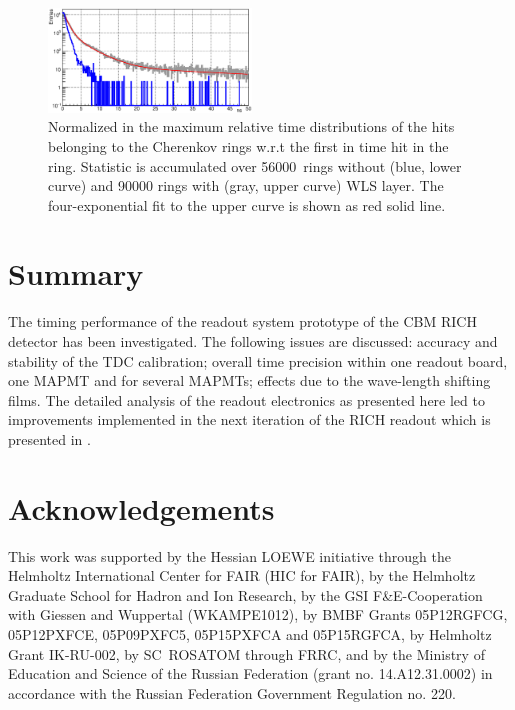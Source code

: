 \documentclass[final,5p,times,twocolumn]{elsarticle}
\begin{document}
\begin{figure}[tbh]
	\centering
	\includegraphics[width=0.48\textwidth]{figures/WLS_on_fitting_with_WLS_off_scaled.eps}
	\caption{Normalized in the maximum relative time distributions of the hits belonging to the Cherenkov rings w.r.t the first in time hit in the ring. Statistic is accumulated over 56000~rings without (blue, lower curve) and 90000 rings with (gray, upper curve) WLS layer. The four-exponential fit to the upper curve is shown as red solid line.}
	\label{fig:WLS}
\end{figure}

\section{Summary}

The timing performance of the readout system prototype of the CBM RICH detector has been investigated. The following issues are discussed: accuracy and stability of the TDC calibration; overall time precision within one readout board, one MAPMT and for several MAPMTs; effects due to the wave-length shifting films. The detailed analysis of the readout electronics as presented here led to improvements implemented in the next iteration of the RICH readout which is presented in \cite{PAULY}.

\section*{Acknowledgements}

This work was supported by the Hessian LOEWE initiative through the Helmholtz International Center for FAIR (HIC for FAIR), by the Helmholtz Graduate School for Hadron and Ion Research, by the GSI F\&E-Cooperation with Giessen and Wuppertal (WKAMPE1012), by BMBF Grants 05P12RGFCG, 05P12PXFCE, 05P09PXFC5, 05P15PXFCA and 05P15RGFCA, by Helmholtz Grant IK-RU-002, by SC~ROSATOM through FRRC, and by the Ministry of Education and Science of the Russian Federation (grant no. 14.A12.31.0002) in accordance with the Russian Federation Government Regulation no. 220.
\end{document}
